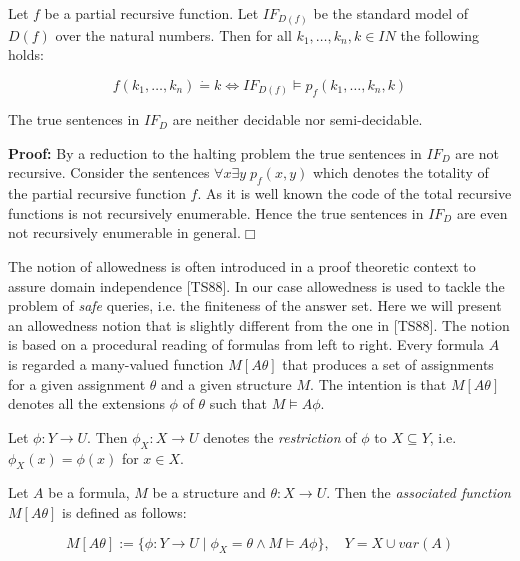 \begin{Lem} Let $f$ be a partial recursive function. Let $IF_{D(f)}$ be the standard model
of $D(f)$ over the natural numbers. Then for all $k_1, \ldots, k_n, k \in I\!\!N$ the 
following holds:

\begin{displaymath}
f(k_1,\ldots,k_n)\dot{=}k \Longleftrightarrow IF_{D(f)} \models p_f(k_1,\ldots,k_n,k)
\end{displaymath}
\end{Lem}

\begin{Pro} 
\label{profun}
The true sentences in $IF_D$ are neither decidable nor semi-decidable.
\end{Pro}

{\bf Proof:} By a reduction to the halting problem the true sentences in $IF_D$ are not 
recursive. Consider the sentences $\forall x \exists y\;p_f(x,y)$ which denotes the totality 
of the partial recursive function $f$. As it is well known the code of the total recursive 
functions is not recursively enumerable. Hence the true sentences in $IF_D$ are even not 
recursively enumerable in general.\hfill $\Box$

The notion of allowedness is often introduced in a proof theoretic context to
assure domain independence [TS88]. In our case allowedness is used to tackle the problem
of {\em safe} queries, i.e. the finiteness of the answer set. Here we will present an
allowedness notion that is slightly different from the one in [TS88]. The notion is
based on a procedural reading of formulas from left to right. Every formula $A$ is regarded
a many-valued function $M[A\theta]$ that produces a set of assignments for a given assignment
$\theta$ and a given structure $M$. The intention is that $M[A\theta]$ denotes all the 
extensions $\phi$ of $\theta$ such that $M \models A\phi$.

\begin{Def} Let $\phi:Y \rightarrow U$. Then $\phi_X:X \rightarrow U$ denotes the {\em 
restriction} of $\phi$ to $X \subseteq Y$, i.e. $\phi_X(x) = \phi(x)$ for $x \in X$.
\end{Def}

\begin{Def} Let $A$ be a formula, $M$ be a structure and $\theta:X \rightarrow U$. Then
the {\em associated function} $M[A\theta]$ is defined as follows:

\begin{displaymath}
M[A\theta]:=\{\phi:Y \rightarrow U\; | \;\phi_X=\theta \wedge M\models A\phi\}, \quad
Y = X \cup var(A)
\end{displaymath}
\end{Def}

